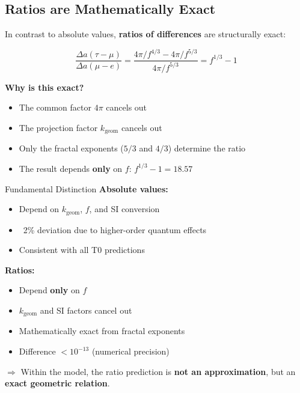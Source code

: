 	\subsection{Ratios are Mathematically Exact}
	
	In contrast to absolute values, \textbf{ratios of differences} are structurally exact:
	
	\begin{equation}
		\frac{\Delta a(\tau - \mu)}{\Delta a(\mu - e)} = \frac{4\pi/f^{4/3} - 4\pi/f^{5/3}}{4\pi/f^{5/3}} = f^{1/3} - 1
	\end{equation}
	
	\textbf{Why is this exact?}
	
	\begin{itemize}
		\item The common factor $4\pi$ cancels out
		\item The projection factor $k_{\text{geom}}$ cancels out
		\item Only the fractal exponents ($5/3$ and $4/3$) determine the ratio
		\item The result depends \textbf{only} on $f$: $f^{1/3} - 1 = 18.57$
	\end{itemize}
	
	\begin{important}{Fundamental Distinction}
		\textbf{Absolute values:}
		\begin{itemize}
			\item Depend on $k_{\text{geom}}$, $f$, and SI conversion
			\item ~2\% deviation due to higher-order quantum effects
			\item Consistent with all T0 predictions
		\end{itemize}
		
		\textbf{Ratios:}
		\begin{itemize}
			\item Depend \textbf{only} on $f$
			\item $k_{\text{geom}}$ and SI factors cancel out
			\item Mathematically exact from fractal exponents
			\item Difference $< 10^{-13}$ (numerical precision)
		\end{itemize}
		
		$\Rightarrow$ Within the model, the ratio prediction is \textbf{not an approximation}, but an \textbf{exact geometric relation}.
	\end{important}
	
